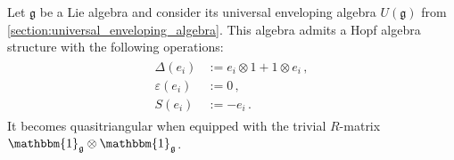     \begin{example}
        Let $\mathfrak{g}$ be a Lie algebra and consider its universal enveloping algebra $U(\mathfrak{g})$ from \cref{section:universal_enveloping_algebra}. This algebra admits a Hopf algebra structure with the following operations:
        \begin{gather}
            \begin{aligned}
                \Delta(e_i) &:= e_i\otimes1+1\otimes e_i\,,\\
                \varepsilon(e_i) &:= 0\,,\\
                S(e_i) &:= -e_i\,.
            \end{aligned}
        \end{gather}
        It becomes quasitriangular when equipped with the trivial $R$-matrix $\mathbbm{1}_{\mathfrak{g}}\otimes\mathbbm{1}_{\mathfrak{g}}$.
    \end{example}

